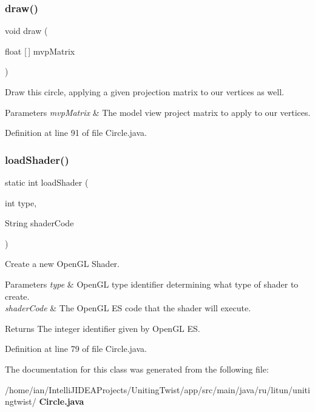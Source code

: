 \subsubsection{draw()}
{\footnotesize\ttfamily void draw (\begin{DoxyParamCaption}\item[{float [$\,$]}]{mvp\+Matrix }\end{DoxyParamCaption})}



Draw this circle, applying a given projection matrix to our vertices as well. 


\begin{DoxyParams}{Parameters}
{\em mvp\+Matrix} & The model view project matrix to apply to our vertices. \\
\hline
\end{DoxyParams}


Definition at line 91 of file Circle.\+java.

\mbox{\label{classunitingtwist_1_1_circle_a711436305cb76f8d625468db4d0cb41d}} 
\subsubsection{load\+Shader()}
{\footnotesize\ttfamily static int load\+Shader (\begin{DoxyParamCaption}\item[{int}]{type,  }\item[{String}]{shader\+Code }\end{DoxyParamCaption})\hspace{0.3cm}{\ttfamily [static]}}



Create a new Open\+GL Shader. 


\begin{DoxyParams}{Parameters}
{\em type} & Open\+GL type identifier determining what type of shader to create. \\
\hline
{\em shader\+Code} & The Open\+GL ES code that the shader will execute. \\
\hline
\end{DoxyParams}
\begin{DoxyReturn}{Returns}
The integer identifier given by Open\+GL ES. 
\end{DoxyReturn}


Definition at line 79 of file Circle.\+java.



The documentation for this class was generated from the following file\+:\begin{DoxyCompactItemize}
\item 
/home/ian/\+Intelli\+J\+I\+D\+E\+A\+Projects/\+Uniting\+Twist/app/src/main/java/ru/litun/unitingtwist/\textbf{ Circle.\+java}\end{DoxyCompactItemize}
